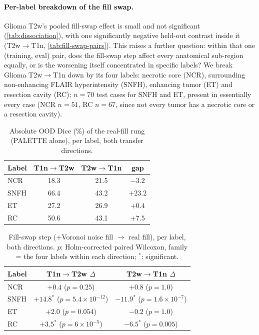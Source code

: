

\paragraph{Per-label breakdown of the fill swap.}
Glioma T2w's pooled fill-swap effect is small and not significant
(\cref{tab:dissociation}), with one significantly negative held-out contrast
inside it (T2w$\to$T1n, \cref{tab:fill-swap-pairs}). This raises a further question: within that one
(training, eval) pair, does the fill-swap step affect every anatomical
sub-region equally, or is the worsening itself concentrated in specific
labels? We break Glioma T2w$\to$T1n down by its four labels: necrotic
core (NCR), surrounding non-enhancing FLAIR hyperintensity (SNFH), enhancing
tumor (ET) and resection cavity (RC);
$n=70$ test cases for SNFH and ET, present in essentially every case
(NCR $n=51$, RC $n=67$, since not every tumor has a necrotic core or a
resection cavity).

\begin{table}[h]
\centering
\small
\setlength{\tabcolsep}{4pt}
\begin{tabular}{lccc}
\toprule
Label & T1n$\to$T2w & T2w$\to$T1n & gap \\
\midrule
NCR  & 18.3 & 21.5 & $-3.2$ \\
SNFH & 66.4 & 43.2 & $+23.2$ \\
ET   & 27.2 & 26.9 & $+0.4$ \\
RC   & 50.6 & 43.1 & $+7.5$ \\
\bottomrule
\end{tabular}
\caption{Absolute OOD Dice (\%) of the real-fill rung (PALETTE alone),
per label, both transfer directions.}
\label{tab:per-label-abs}
\end{table}

\begin{table}[h]
\centering
\small
\setlength{\tabcolsep}{4pt}
\begin{tabular}{lcc}
\toprule
Label & T1n$\to$T2w $\Delta$ & T2w$\to$T1n $\Delta$ \\
\midrule
NCR  & $+0.4$ ($p=0.25$) & $+0.8$ ($p=1.0$) \\
SNFH & $+14.8^{*}$ ($p=5.4\times10^{-12}$) & $-11.9^{*}$ ($p=1.6\times10^{-7}$) \\
ET   & $+2.0$ ($p=0.054$) & $-0.2$ ($p=1.0$) \\
RC   & $+3.5^{*}$ ($p=6\times10^{-5}$) & $-6.5^{*}$ ($p=0.005$) \\
\bottomrule
\end{tabular}
\caption{Fill-swap step (+Voronoi noise fill $\to$ real fill),
per label, both directions. $p$: Holm-corrected paired Wilcoxon, family =
the four labels within each direction; $^*$: significant.}
\label{tab:per-label-delta}
\end{table}

